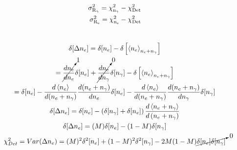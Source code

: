 \begin{equation}
\begin{split}
\rm \sigma_{R_\gamma}^2 = \chi_{n_\gamma}^2 - \chi_{Det}^2  \\
\rm \sigma_{R_e}^2 = \chi_{n_e}^2 - \chi_{Det}^2 \\
\label{eq:SigR_Cent}
\end{split}
\end{equation}


\begin{multline}\\
\delta[\Delta n_e] = \delta[n_e] - \delta\left[\left<n_e\right>_{n_e+n_\gamma}\right]  \\
= \cancelto{1}{\frac{dn_e}{dn_e}} \delta[n_e] + \cancelto{0}{\frac{dn_e}{dn_\gamma}} \delta[n_\gamma] - \delta \left[\left<n_e\right>_{n_e+n_\gamma}\right] \\
= \delta[n_e] - \frac{d \left<n_e\right> }{d(n_e+n_\gamma)} \frac{d(n_e+n_\gamma)}{dn_e} \delta[n_e] - \frac{d\left<n_e\right>}{d(n_e+n_\gamma)} \frac{d(n_e+n_\gamma)}{dn_\gamma} \delta[n_\gamma] \\
\delta[\Delta n_e] = \delta[n_e] - \left(\delta[n_\gamma] + \delta[n_e]\right) \frac{d\left<n_e+n_\gamma\right>}{d\left(n_e+n_\gamma\right)} \\
\delta[\Delta n_e] = (M)\delta[n_e] - (1-M) \delta[n_\gamma] \\
\chi_{Det}^2 = Var(\Delta n_e) = (M)^2\delta^2[n_e] + (1-M)^2\delta^2[n_\gamma]-2M(1-M) \cancelto{0}{\delta[n_e]\delta[n_\gamma]} \\
\label{eq:Centroid}
\end{multline}


